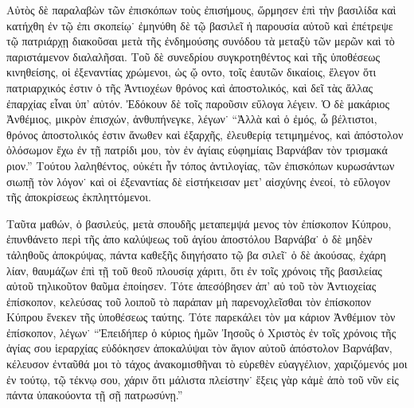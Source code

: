 Αὐτὸς δὲ παραλαβὼν τῶν ἐπισκόπων τοὺς ἐπισήμους,
ὥρμησεν ἐπὶ τὴν βασιλίδα καὶ κατήχθη ἐν τῷ ἐπι%
σκοπείῳ˙ ἐμηνύθη δὲ τῷ βασιλεῖ ἡ παρουσία αὐτοῦ καὶ
ἐπέτρεψε τῷ πατριάρχῃ διακοῦσαι μετὰ τῆς ἐνδημούσης
συνόδου τὰ μεταξὺ τῶν μερῶν καὶ τὸ παριστάμενον
διαλαλῆσαι. Τοῦ δὲ συνεδρίου συγκροτηθέντος καὶ τῆς
ὑποθέσεως κινηθείσης, οἱ ἐξεναντίας χρώμενοι, ὡς ᾤ%
οντο, τοῖς ἑαυτῶν δικαίοις, ἔλεγον ὅτι πατριαρχικός ἐστιν
ὁ τῆς Ἀντιοχέων θρόνος καὶ ἀποστολικός, καὶ δεῖ τὰς
ἄλλας ἐπαρχίας εἶναι ὑπ’ αὐτόν. Ἐδόκουν δὲ τοῖς παροῦσιν
εὔλογα λέγειν. Ὁ δὲ μακάριος Ἀνθέμιος, μικρὸν ἐπισχών,
ἀνθυπήνεγκε, λέγων˙ \enquote{Ἀλλὰ καὶ ὁ ἐμός, ὦ βέλτιστοι,
θρόνος ἀποστολικός ἐστιν ἄνωθεν καὶ ἐξαρχῆς, ἐλευθερίᾳ
τετιμημένος, καὶ ἀπόστολον ὁλόσωμον ἔχω ἐν τῇ πατρίδι
μου, τὸν ἐν ἁγίαις εὐφημίαις Βαρνάβαν τὸν τρισμακά%
ριον.} Τούτου λαληθέντος, οὐκέτι ἦν τόπος ἀντιλογίας,
τῶν ἐπισκόπων κυρωσάντων σιωπῇ τὸν λόγον˙ καὶ οἱ
ἐξεναντίας δὲ εἱστήκεισαν μετ’ αἰσχύνης ἐνεοί, τὸ εὔλογον
τῆς ἀποκρίσεως ἐκπληττόμενοι.

Ταῦτα μαθών, ὁ βασιλεύς, μετὰ σπουδῆς μεταπεμψά%
μενος τὸν ἐπίσκοπον Κύπρου, ἐπυνθάνετο περὶ τῆς ἀπο%
καλύψεως τοῦ ἁγίου ἀποστόλου Βαρνάβα˙ ὁ δὲ μηδὲν
τἀληθοῦς ἀποκρύψας, πάντα καθεξῆς διηγήσατο τῷ βα%
σιλεῖ˙ ὁ δὲ ἀκούσας, ἐχάρη λίαν, θαυμάζων ἐπὶ τῇ τοῦ
θεοῦ πλουσίᾳ χάριτι, ὅτι ἐν τοῖς χρόνοις τῆς βασιλείας
αὐτοῦ τηλικοῦτον θαῦμα ἐποίησεν. Τότε ἀπεσόβησεν ἀπ’ αὐ%
τοῦ τὸν Ἀντιοχείας ἐπίσκοπον, κελεύσας τοῦ λοιποῦ
τὸ παράπαν μὴ παρενοχλεῖσθαι τὸν ἐπίσκοπον Κύπρου
ἕνεκεν τῆς ὑποθέσεως ταύτης. Τότε παρεκάλει τὸν μα%
κάριον Ἀνθέμιον τὸν ἐπίσκοπον, λέγων˙ \enquote{Ἐπειδήπερ ὁ
κύριος ἡμῶν Ἰησοῦς ὁ Χριστὸς ἐν τοῖς χρόνοις τῆς
ἁγίας σου ἱεραρχίας εὐδόκησεν ἀποκαλύψαι τὸν ἅγιον
αὐτοῦ ἀπόστολον Βαρνάβαν, κέλευσον ἐνταῦθά μοι τὸ
τάχος ἀνακομισθῆναι τὸ εὑρεθὲν εὐαγγέλιον, χαριζόμενός
μοι ἐν τούτῳ, τῷ τέκνῳ σου, χάριν ὅτι μάλιστα πλείστην˙
ἕξεις γὰρ κἀμὲ ἀπὸ τοῦ νῦν εἰς πάντα ὑπακούοντα
τῇ σῇ πατρωσύνῃ.}

